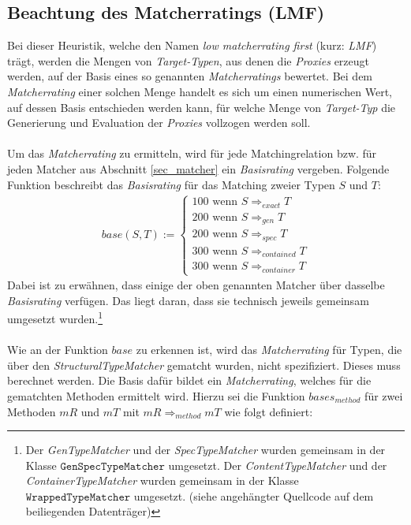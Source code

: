 \subsection{Beachtung des Matcherratings (LMF)}\label{sec_lmf}
Bei dieser \Gls{Heuristik}, welche den Namen \emph{low matcherrating first} (kurz: \emph{LMF}) trägt, werden die Mengen von \emph{Target-Typen}, aus denen die \emph{Proxies} erzeugt werden, auf der Basis eines so genannten \emph{Matcherratings} bewertet. Bei dem \emph{Matcherrating} einer solchen Menge handelt es sich um einen numerischen Wert, auf dessen Basis entschieden werden kann, für welche Menge von \emph{Target-Typ} die Generierung und Evaluation der \emph{Proxies} vollzogen werden soll.
\\\\
Um das \emph{Matcherrating} zu ermitteln, wird für jede Matchingrelation bzw. für jeden Matcher aus Abschnitt \ref{sec_matcher} ein \emph{Basisrating} vergeben. Folgende Funktion beschreibt das \emph{Basisrating} für das Matching zweier Typen $S$ und $T$:
\begin{gather*}
\mathit{base(S,T)} :=  \left\{ 
				\begin{array}{l}
					100 \text{ wenn } S \Rightarrow_{exact}  T  \\
					200 \text{ wenn } S \Rightarrow_{gen}  T  \\
					200 \text{ wenn } S \Rightarrow_{spec}  T  \\
					300 \text{ wenn } S \Rightarrow_{contained}  T   \\
					300 \text{ wenn } S \Rightarrow_{container}  T  				
				\end{array}             
	\right.
\end{gather*}
\noindent
Dabei ist zu erwähnen, dass einige der oben genannten Matcher über dasselbe \emph{Basisrating} verfügen. Das liegt daran, dass sie technisch jeweils gemeinsam umgesetzt wurden.\footnote{Der \emph{GenTypeMatcher} und der \emph{SpecTypeMatcher} wurden gemeinsam in der Klasse $\texttt{GenSpecTypeMatcher}$ umgesetzt. Der \emph{ContentTypeMatcher} und der \emph{ContainerTypeMatcher} wurden gemeinsam in der Klasse $\texttt{WrappedTypeMatcher}$ umgesetzt. (siehe angehängter Quellcode auf dem beiliegenden Datenträger)}
\\\\
Wie an der Funktion $\mathit{base}$ zu erkennen ist, wird das \emph{Matcherrating} für Typen, die über den \emph{StructuralTypeMatcher} gematcht wurden, nicht spezifiziert. Dieses muss berechnet werden. Die Basis dafür bildet ein \emph{Matcherrating}, welches für die gematchten Methoden ermittelt wird. Hierzu sei die Funktion $\mathit{bases_{method}}$ für zwei Methoden $\mathit{mR}$ und $\mathit{mT}$ mit $\mathit{mR} \Rightarrow_{method} \mathit{mT}$ wie folgt definiert:
